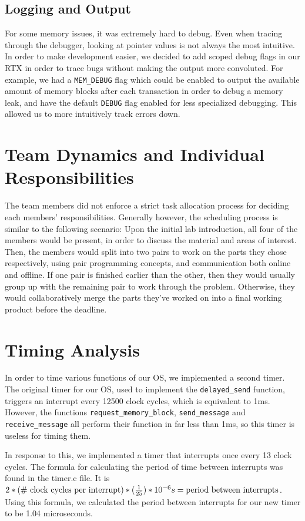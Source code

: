 \documentclass[12pt]{report}
\begin{document}
\section{Logging and Output}
For some memory issues, it was extremely hard to debug. Even when tracing through the debugger, looking at pointer values is not always the most intuitive. In order to make development easier, we decided to add scoped debug flags in our RTX in order to trace bugs without making the output more convoluted. For example, we had a \texttt{MEM_DEBUG} flag which could be enabled to output the available amount of memory blocks after each transaction in order to debug a memory leak, and have the default \texttt{DEBUG} flag enabled for less specialized debugging. This allowed us to more intuitively track errors down.

\chapter{Team Dynamics and Individual Responsibilities}
The team members did not enforce a strict task allocation process for deciding each members' responsibilities. Generally however, the scheduling process is similar to the following scenario:
Upon the initial lab introduction, all four of the members would be present, in order to discuss the material and areas of interest. Then, the members would split into two pairs to work on the parts they chose respectively, using pair programming concepts, and communication both online and offline. If one pair is finished earlier than the other, then they would usually group up with the remaining pair to work through the problem. Otherwise, they would collaboratively merge the parts they've worked on into a final working product before the deadline.

\chapter{Timing Analysis}

In order to time various functions of our OS, we implemented a second timer.  The original timer for our OS, used to implement the \texttt{delayed_send} function, triggers an interrupt every 12500 clock cycles, which is equivalent to 1ms.  However, the functions \texttt{request_memory_block}, \texttt{send_message} and \texttt{receive_message} all perform their function in far less than 1ms, so this timer is useless for timing them.

In response to this, we implemented a timer that interrupts once every 13 clock cycles.  The formula for calculating the period of time between interrupts was found in the timer.c file.  It is $2*(\textnormal{\# clock cycles per interrupt})*(\frac{1}{25}) * 10^{-6} s = \textnormal{period between interrupts}$.  Using this formula, we calculated the period between interrupts for our new timer to be 1.04 microseconds.
\end{document}
